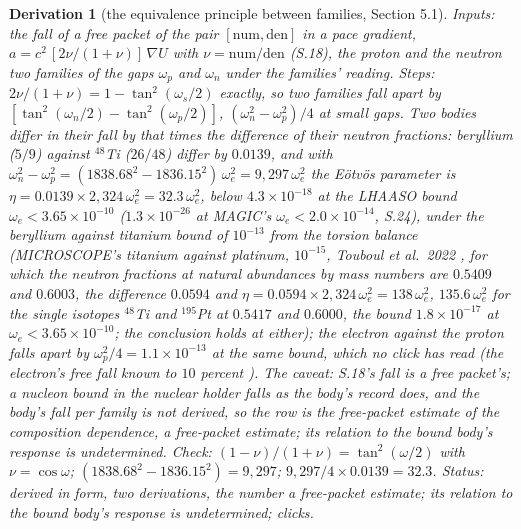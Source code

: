 \documentclass[pdflatex,sn-mathphys-num]{sn-jnl}
\newcommand{\num}{\mathrm{num}}
\newcommand{\den}{\mathrm{den}}
\theoremstyle{thmstyleone}
\newtheorem{derivation}{Derivation}
\begin{document}
\begin{derivation}[the equivalence principle between families, Section 5.1]
\emph{Inputs:} the fall of a free packet of the pair $[\num, \den]$ in a pace gradient, $a = c^2\,[2\nu / (1 + \nu)]\,\nabla U$ with $\nu = \num / \den$ (S.18), the proton and the neutron two families of the gaps $\omega_p$ and $\omega_n$ under the families' reading. \emph{Steps:} $2\nu / (1 + \nu) = 1 - \tan^2(\omega_s / 2)$ exactly, so two families fall apart by $[\tan^2(\omega_n / 2) - \tan^2(\omega_p / 2)]$, $(\omega_n^2 - \omega_p^2) / 4$ at small gaps. Two bodies differ in their fall by that times the difference of their neutron fractions: beryllium ($5 / 9$) against $^{48}$Ti ($26 / 48$) differ by $0.0139$, and with $\omega_n^2 - \omega_p^2 = (1838.68^2 - 1836.15^2)\,\omega_e^2 = 9{,}297\,\omega_e^2$ the E\"otv\"os parameter is $\eta = 0.0139 \times 2{,}324\,\omega_e^2 = 32.3\,\omega_e^2$, below $4.3 \times 10^{-18}$ at the LHAASO bound $\omega_e < 3.65 \times 10^{-10}$ ($1.3 \times 10^{-26}$ at MAGIC's $\omega_e < 2.0 \times 10^{-14}$, S.24), under the beryllium against titanium bound of $10^{-13}$ from the torsion balance \cite{schlamminger} (MICROSCOPE's titanium against platinum, $10^{-15}$, Touboul et al.\ 2022 \cite{microscope}, for which the neutron fractions at natural abundances by mass numbers are $0.5409$ and $0.6003$, the difference $0.0594$ and $\eta = 0.0594 \times 2{,}324\,\omega_e^2 = 138\,\omega_e^2$, $135.6\,\omega_e^2$ for the single isotopes $^{48}$Ti and $^{195}$Pt at $0.5417$ and $0.6000$, the bound $1.8 \times 10^{-17}$ at $\omega_e < 3.65 \times 10^{-10}$; the conclusion holds at either); the electron against the proton falls apart by $\omega_p^2 / 4 = 1.1 \times 10^{-13}$ at the same bound, which no click has read (the electron's free fall known to $10$ percent \cite{witteborn}). The caveat: S.18's fall is a free packet's; a nucleon bound in the nuclear holder falls as the body's record does, and the body's fall per family is not derived, so the row is the free-packet estimate of the composition dependence, a free-packet estimate; its relation to the bound body's response is undetermined. \emph{Check:} $(1 - \nu) / (1 + \nu) = \tan^2(\omega / 2)$ with $\nu = \cos\omega$; $(1838.68^2 - 1836.15^2) = 9{,}297$; $9{,}297 / 4 \times 0.0139 = 32.3$. \emph{Status:} derived in form, two derivations, the number a free-packet estimate; its relation to the bound body's response is undetermined; clicks.
\end{derivation}
\end{document}
